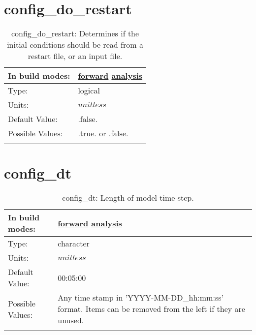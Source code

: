 \section[config\_do\_restart]{config\_do\_restart}
\label{sec:nm_sec_config_do_restart}
\begin{center}
\begin{longtable}{| p{2.0in} || p{4.0in} |}
    \hline
    In build modes: & \hyperref[subsec:forward_nm_tab_time_management]{forward} \hyperref[subsec:analysis_nm_tab_time_management]{analysis} \\
    \hline
    Type: & logical \\
    \hline
    Units: & $unitless$ \\
    \hline
    Default Value: & .false. \\
    \hline
    Possible Values: & .true. or .false. \\
    \hline
    \caption{config\_do\_restart: Determines if the initial conditions should be read from a restart file, or an input file.}
\end{longtable}
\end{center}
\section[config\_dt]{config\_dt}
\label{sec:nm_sec_config_dt}
\begin{center}
\begin{longtable}{| p{2.0in} || p{4.0in} |}
    \hline
    In build modes: & \hyperref[subsec:forward_nm_tab_time_integration]{forward} \hyperref[subsec:analysis_nm_tab_time_integration]{analysis} \\
    \hline
    Type: & character \\
    \hline
    Units: & $unitless$ \\
    \hline
    Default Value: & 00:05:00 \\
    \hline
    Possible Values: & Any time stamp in 'YYYY-MM-DD\_hh:mm:ss' format. Items can be removed from the left if they are unused. \\
    \hline
    \caption{config\_dt: Length of model time-step.}
\end{longtable}
\end{center}

